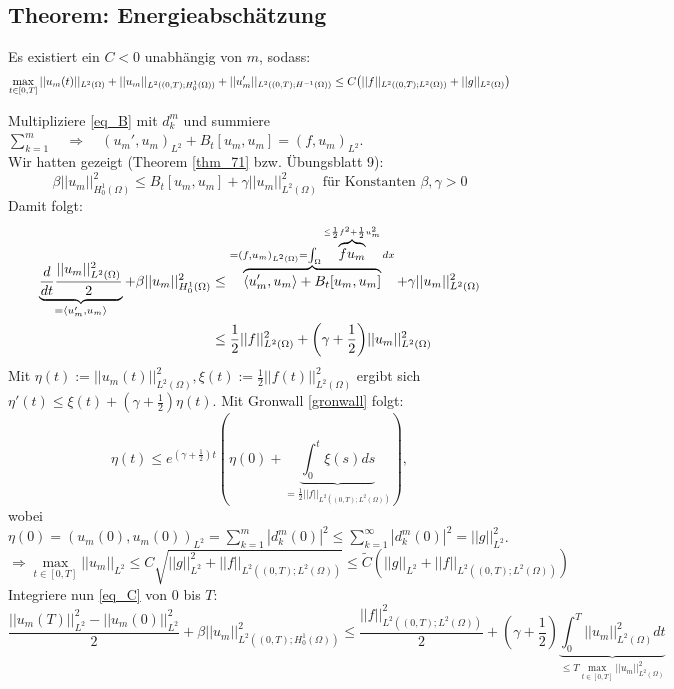 \subsection{Theorem: Energieabschätzung}
\label{energieabsch}
	Es existiert ein $C < 0$ unabhängig von $m$, sodass:
	\[ \max_{t \in [0,T]} ||u_m(t)||_{L^2(\Omega)} + ||u_m||_{L^2((0,T);H_0^1(\Omega))} + ||u'_m||_{L^2((0,T);H^{-1}(\Omega))} \leq C \enbrace*{||f||_{L^2((0,T);L^2(\Omega))} + ||g||_{L^2(\Omega)}} \]
	
	Multipliziere \eqref{eq_B} mit $d_k^m$ und summiere $\sum_{k=1}^m \quad \Rightarrow \quad (u_m',u_m)_{L^2} + B_t[u_m,u_m] = (f,u_m)_{L^2}$. \\
	Wir hatten gezeigt (Theorem \ref{thm_71} bzw. Übungsblatt 9):
	\[ \beta ||u_m||_{H_0^1(\Omega)}^2 \leq B_t[u_m,u_m] + \gamma ||u_m||_{L^2(\Omega)}^2 \text{ für Konstanten } \beta,\gamma > 0 \]
	Damit folgt:
	\begin{equation}
	\begin{aligned}
	\underbrace{\frac{d}{dt} \frac{||u_m||_{L^2(\Omega)}^2}{2}}_{= \langle u_m',u_m \rangle} + \beta ||u_m||_{H_0^1(\Omega)}^2 &\leq \overbrace{\langle u_m',u_m \rangle + B_t[u_m,u_m]}^{=(f,u_m)_{L^2(\Omega)} = \int_{\Omega} \overbrace{f u_m}^{\leq \frac{1}{2} f^2 + \frac{1}{2} u_m^2} dx} + \gamma ||u_m||_{L^2(\Omega)}^2 \\
	&\leq \frac{1}{2} ||f||_{L^2(\Omega)}^2 + \enbrace*{\gamma + \frac{1}{2}} ||u_m||_{L^2(\Omega)}^2 \label{eq_C}
	\end{aligned}
	\end{equation}
	Mit $\eta(t) := ||u_m(t)||_{L^2(\Omega)}^2, \xi(t) := \frac{1}{2} ||f(t)||_{L^2(\Omega)}^2$ ergibt sich $\eta'(t) \leq \xi(t) + (\gamma + \frac{1}{2}) \eta(t)$. Mit Gronwall \ref{gronwall} folgt:
	\[ \eta(t) \leq e^{(\gamma + \frac{1}{2})t} (\eta(0) + \underbrace{\int_{0}^{t} \xi(s) ds}_{= \frac{1}{2} ||f||_{L^2((0,T);L^2(\Omega))}}), \]
	wobei $\eta(0) = (u_m(0),u_m(0))_{L^2} = \sum\limits_{k=1}^{m} |d_k^m(0)|^2 \leq \sum\limits_{k=1}^{\infty} |d_k^m(0)|^2 = ||g||_{L^2}^2$.
	\[ \Rightarrow \max_{t \in [0,T]} ||u_m||_{L^2} \leq C \sqrt{||g||_{L^2}^2 + ||f||_{L^2((0,T);L^2(\Omega))}} \leq \widetilde{C} (||g||_{L^2} + ||f||_{L^2((0,T);L^2(\Omega))}) \]
	Integriere nun \eqref{eq_C} von 0 bis $T$:
	\[ \frac{||u_m(T)||_{L^2}^2 - ||u_m(0)||_{L^2}^2}{2} + \beta ||u_m||_{L^2((0,T);H_0^1(\Omega))}^2 \leq \frac{||f||_{L^2((0,T);L^2(\Omega))}^2}{2} + (\gamma + \frac{1}{2}) \underbrace{\int_{0}^{T} ||u_m||_{L^2(\Omega)}^2 dt}_{\leq T \max_{t \in [0,T]} ||u_m||_{L^2(\Omega)}^2} \]
